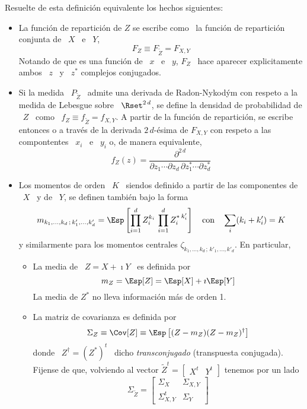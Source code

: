 Resuelte de esta definici\'on equivalente los hechos siguientes:
%
\begin{itemize}
\item La  funci\'on de repartici\'on  de $Z$ se  escribe como \ la  funci\'on de
  repartici\'on conjunta de \ $X$ \ e \ $Y$,
  \[
  F_Z \equiv F_{\widetilde{Z}} = F_{X,Y}
  \]
  Notando de  que es una  funci\'on de \  $x$ \ e \  $y$, $F_Z$ \  hace aparecer
  explicitamente ambos \ $z$ \ y \ $z^*$ complejos conjugados.
%
\item   Si  la   medida  \   $P_{\widetilde{Z}}$  \   admite  una   derivada  de
  Radon-Nykod\'ym con respeto a la medida  de Lebesgue sobre \ $\Rset^{2 \, d}$,
  se  define  la  densidad de  probabilidad  de  \  $Z$  \  como \  $f_Z  \equiv
  f_{\widetilde{Z}} =  f_{X,Y}$. A partir  de la funci\'on de  repartici\'on, se
  escribe entonces o a trav\'es de la derivada $2 \, d$-\'esima de $F_{X,Y}$ con
  respeto a las compontentes \ $x_i$ \ e \ $y_i$ o, de manera equivalente,
  \[
  f_Z(z) = \frac{\partial^{2 \, d}}{\partial z_1 \cdots \partial z_d \, \partial
    z_1^* \cdots \partial z_d^*}
  \]
%
\item Los momentos de orden \ $K$ \ siendos definido a partir de las componentes
  de \ $X$ \ y de \ $Y$, se definen tambi\'en bajo la forma
  \[
  m_{k_1 , \ldots , k_d \, ; \, k'_1 , \ldots , k'_d} = \Esp\left[ \prod_{i=1}^d
    Z_i^{k_i}  \,  \prod_{i=1}^d   Z_i^{* \: k'_i}  \right]  \quad
  \mbox{con} \quad \sum_i (k_i + k'_i) = K
  \]
  y similarmente para los momentos centrales  $\zeta_{k_1 , \ldots , k_d \, ; \,
    k'_1 , \ldots , k'_d}$.  En particular,
  \begin{itemize}
  \item La media de \ $Z = X + \imath Y$ \ es definida por
    \[
    m_Z = \Esp[Z] = \Esp[X] + \imath \Esp[Y]
    \]
    La media de $Z^*$ no lleva informaci\'on m\'as de orden 1.
  \item La matriz de covarianza es definida por
    \[
    \Sigma_Z \equiv \Cov[Z] \equiv \Esp\left[ (Z-m_Z) (Z-m_Z)^\dag \right]
    \]
    donde  \  $Z^\dag  =  (Z^*)^t$  \ dicho  {\em  transconjugado}  (transpuesta
    conjugada).    Fijense  de   que,  volviendo   al   vector  $\widetilde{Z}^t
    = \begin{bmatrix} X^t & Y^t \end{bmatrix}$ tenemos por un lado
    \[
    \Sigma_{\widetilde{Z}}  = \begin{bmatrix}
      \Sigma_X & \Sigma_{X,Y}\\ \Sigma_{X,Y}^t & \Sigma_Y\end{bmatrix}
\]
\end{itemize}
\end{itemize}
